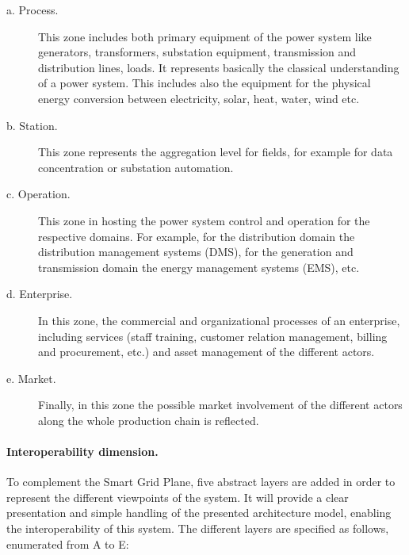 \documentclass[a4paper,11pt,twoside,openright]{report}
\begin{document}
\begin{description}
	\item[a. Process.] This zone includes both primary equipment of the power system like generators, transformers, substation equipment, transmission and distribution lines, loads. It represents basically the classical understanding of a power system. This includes also the equipment for the physical energy conversion between electricity, solar, heat, water, wind etc.
	\item[b. Station.] This zone represents the aggregation level for fields, for example for data concentration or substation automation.
	\item[c. Operation.] This zone in hosting the power system control and operation for the respective domains. For example, for the distribution domain the distribution management systems (DMS), for the generation and transmission domain the energy management systems (EMS), etc. 
	\item[d. Enterprise.] In this zone, the commercial and organizational processes of an enterprise, including services (staff training, customer relation management, billing and procurement, etc.) and asset management of the different actors. 
	\item[e. Market.] Finally, in this zone the possible market involvement of the different actors along the whole production chain is reflected. 
\end{description}

\paragraph{Interoperability dimension.} To complement the Smart Grid Plane, five abstract layers are added in order to represent the different viewpoints of the system. It will provide a clear presentation and simple handling of the presented architecture model, enabling the interoperability of this system. The different layers are specified as follows, enumerated from A to E: 
\end{document}
